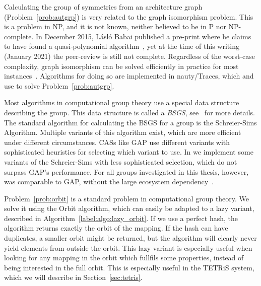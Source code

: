 Calculating the group of symmetries from an architecture graph (Problem~\ref{prob:autgrp}) is very related to the graph isomorphism problem. 
This is a problem in NP, and it is not known, neither believed to be in P nor NP-complete. 
In December 2015, L\'{a}sl\'{o} Babai published a pre-print where he claims to have found a quasi-polynomial algorithm~\cite{babai_graph_isomorphism}, 
yet at the time of this writing (January 2021) the peer-review is still not complete.
Regardless of the worst-case complexity, graph isomorphism can be solved efficiently in practice for most instances~\cite{McKay201493}.
Algorithms for doing so are implemented in nauty/Traces, which \mocasin and \mpsym use to solve Problem~\ref{prob:autgrp}.

Most algorithms in computational group theory use a special data structure describing the group.
This data structure is called a \emph{\ac{BSGS}}, see~\cite{holt,seress2003permutation} for more details.
The standard algorithm for calculating the \ac{BSGS} for a group is the Schreier-Sims Algorithm.
Multiple variants of this algorithm exist, which are more efficient under different circumstances.
\acp{CAS} like \ac{GAP} use different variants with sophisticated heuristics for selecting which variant to use.
In \mpsym we implement some variants of the Schreier-Sims with less sophisticated selection, which do not surpass \ac{GAP}'s performance.
For all groups investigated in this thesis, however, \mpsym was comparable to \ac{GAP}, without the large ecosystem dependency~\cite{nicolai_studienarbeit,goens_tcad21}.

Problem~\ref{prob:orbit} is a standard problem in computational group theory.
We solve it using the Orbit algorithm, which can easily be adapted to a lazy variant, described in Algorithm~\ref{label:algo:lazy_orbit}.
If we use a perfect hash, the algorithm returns exactly the orbit of the mapping.
If the hash can have duplicates, a smaller orbit might be returned, but the algorithm will clearly never yield elements from outside the orbit.
This lazy variant is especially useful when looking for any mapping in the orbit which fullfils some properties, instead of being interested in the full orbit.
This is especially useful in the \acs*{TETRiS} system, which we will describe in Section~\ref{sec:tetris}.

